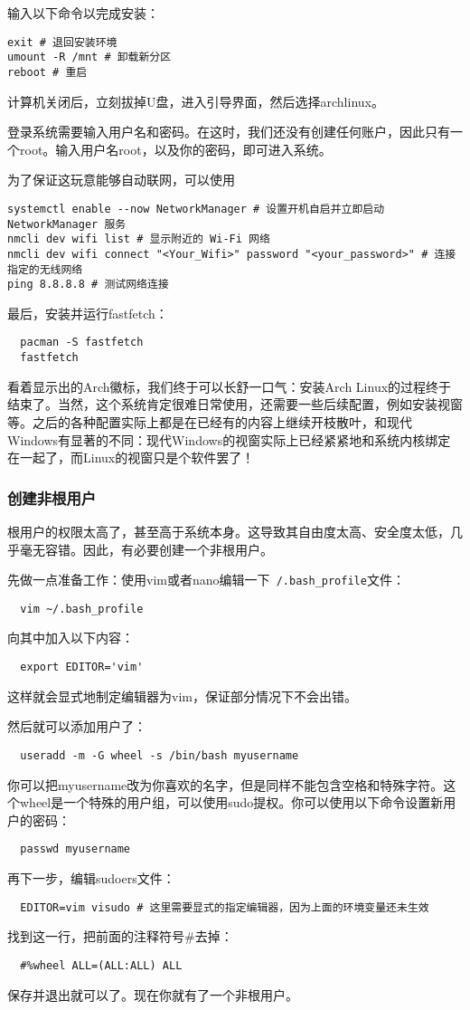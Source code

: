 输入以下命令以完成安装：
\begin{lstlisting}
exit # 退回安装环境
umount -R /mnt # 卸载新分区
reboot # 重启
\end{lstlisting}
计算机关闭后，立刻拔掉U盘，进入引导界面，然后选择archlinux。

登录系统需要输入用户名和密码。在这时，我们还没有创建任何账户，因此只有一个root。输入用户名root，以及你的密码，即可进入系统。

为了保证这玩意能够自动联网，可以使用
\begin{lstlisting}
systemctl enable --now NetworkManager # 设置开机自启并立即启动 NetworkManager 服务
nmcli dev wifi list # 显示附近的 Wi-Fi 网络
nmcli dev wifi connect "<Your_Wifi>" password "<your_password>" # 连接指定的无线网络
ping 8.8.8.8 # 测试网络连接
\end{lstlisting}

最后，安装并运行fastfetch：
\begin{lstlisting}
  pacman -S fastfetch
  fastfetch
\end{lstlisting}
看着显示出的Arch徽标，我们终于可以长舒一口气：安装Arch Linux的过程终于结束了。当然，这个系统肯定很难日常使用，还需要一些后续配置，例如安装视窗等。之后的各种配置实际上都是在已经有的内容上继续开枝散叶，和现代Windows有显著的不同：现代Windows的视窗实际上已经紧紧地和系统内核绑定在一起了，而Linux的视窗只是个软件罢了！

\subsubsection{创建非根用户}

根用户的权限太高了，甚至高于系统本身。这导致其自由度太高、安全度太低，几乎毫无容错。因此，有必要创建一个非根用户。

先做一点准备工作：使用vim或者nano编辑一下\texttt{~/.bash\_profile}文件：
\begin{lstlisting}
  vim ~/.bash_profile
\end{lstlisting}
向其中加入以下内容：
\begin{lstlisting}
  export EDITOR='vim'
\end{lstlisting}
这样就会显式地制定编辑器为vim，保证部分情况下不会出错。

然后就可以添加用户了：
\begin{lstlisting}
  useradd -m -G wheel -s /bin/bash myusername
\end{lstlisting}
你可以把myusername改为你喜欢的名字，但是同样不能包含空格和特殊字符。这个wheel是一个特殊的用户组，可以使用sudo提权。你可以使用以下命令设置新用户的密码：
\begin{lstlisting}
  passwd myusername
\end{lstlisting}
再下一步，编辑sudoers文件：
\begin{lstlisting}
  EDITOR=vim visudo # 这里需要显式的指定编辑器，因为上面的环境变量还未生效
\end{lstlisting}
找到这一行，把前面的注释符号\#去掉：
\begin{lstlisting}
  #%wheel ALL=(ALL:ALL) ALL
\end{lstlisting}
保存并退出就可以了。现在你就有了一个非根用户。


